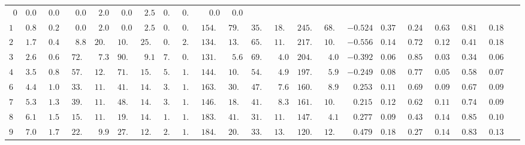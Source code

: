 \documentclass[oldversion]{aa}
\begin{document}
\begin{landscape}
\begin{table}[hbp]
\begin{center}
\begin{tabular}{r r r r r r r r r r r r r r r r r r r r r r}
\hline
$     0 $ & $  0.00 $ & $  0.00 $ & $   0.0 $ & $   2.0 $ & $   0.0 $ & $   2.5 $ & $   0.0 $ & $   0.2 $ & $   0.0 $  & $   0.0 $ &  &  &  &  &  &  &  &  &  & \\
$    12 $ & $  0.88 $ & $  0.22 $ & $   0.0 $ & $   2.0 $ & $   0.0 $ & $   2.5 $ & $   0.0 $ & $   0.2 $ & $ 154.2 $  & $  79.0 $ & $  35.3 $ & $  18.7 $ & $ 245.0 $ & $  68.7 $ & $ -0.524 $ & $  0.379 $ & $  0.244 $ & $  0.639 $ & $  0.816 $ & $  0.189 $\\
$    24 $ & $  1.77 $ & $  0.44 $ & $   8.8 $ & $  20.8 $ & $  10.9 $ & $  25.9 $ & $   0.9 $ & $   2.1 $ & $ 134.9 $  & $  13.1 $ & $  65.4 $ & $  11.7 $ & $ 217.7 $ & $  10.5 $ & $ -0.556 $ & $  0.142 $ & $  0.720 $ & $  0.122 $ & $  0.416 $ & $  0.186 $\\
$    36 $ & $  2.65 $ & $  0.66 $ & $  72.4 $ & $   7.3 $ & $  90.4 $ & $   9.1 $ & $   7.2 $ & $   0.7 $ & $ 131.2 $  & $   5.6 $ & $  69.7 $ & $   4.0 $ & $ 204.7 $ & $   4.0 $ & $ -0.392 $ & $  0.060 $ & $  0.852 $ & $  0.035 $ & $  0.348 $ & $  0.065 $\\
$    48 $ & $  3.54 $ & $  0.87 $ & $  57.2 $ & $  12.1 $ & $  71.5 $ & $  15.1 $ & $   5.7 $ & $   1.2 $ & $ 144.6 $  & $  10.0 $ & $  54.4 $ & $   4.9 $ & $ 197.9 $ & $   5.9 $ & $ -0.249 $ & $  0.081 $ & $  0.774 $ & $  0.054 $ & $  0.582 $ & $  0.070 $\\
$    60 $ & $  4.42 $ & $  1.09 $ & $  33.5 $ & $  11.8 $ & $  41.9 $ & $  14.7 $ & $   3.4 $ & $   1.2 $ & $ 163.9 $  & $  30.5 $ & $  47.8 $ & $   7.6 $ & $ 160.0 $ & $   8.9 $ & $  0.253 $ & $  0.112 $ & $  0.696 $ & $  0.093 $ & $  0.672 $ & $  0.099 $\\
$    72 $ & $  5.31 $ & $  1.31 $ & $  39.0 $ & $  11.5 $ & $  48.7 $ & $  14.3 $ & $   3.9 $ & $   1.1 $ & $ 146.1 $  & $  18.2 $ & $  41.5 $ & $   8.3 $ & $ 161.1 $ & $  10.9 $ & $  0.215 $ & $  0.125 $ & $  0.627 $ & $  0.111 $ & $  0.749 $ & $  0.096 $\\
$    84 $ & $  6.19 $ & $  1.53 $ & $  15.9 $ & $  11.2 $ & $  19.8 $ & $  14.0 $ & $   1.6 $ & $   1.1 $ & $ 183.1 $  & $  41.9 $ & $  31.0 $ & $  11.3 $ & $ 147.4 $ & $   4.1 $ & $  0.277 $ & $  0.096 $ & $  0.434 $ & $  0.144 $ & $  0.857 $ & $  0.101 $\\
$    96 $ & $  7.08 $ & $  1.75 $ & $  22.0 $ & $   9.9 $ & $  27.4 $ & $  12.4 $ & $   2.2 $ & $   1.0 $ & $ 184.0 $  & $  20.7 $ & $  33.6 $ & $  13.6 $ & $ 120.0 $ & $  12.5 $ & $  0.479 $ & $  0.182 $ & $  0.276 $ & $  0.144 $ & $  0.833 $ & $  0.132 $\\

\end{tabular}
\end{center}
\end{table}
\end{landscape}
\end{document}
